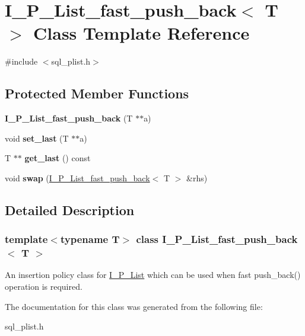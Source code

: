 \hypertarget{classI__P__List__fast__push__back}{}\section{I\+\_\+\+P\+\_\+\+List\+\_\+fast\+\_\+push\+\_\+back$<$ T $>$ Class Template Reference}
\label{classI__P__List__fast__push__back}


{\ttfamily \#include $<$sql\+\_\+plist.\+h$>$}

\subsection*{Protected Member Functions}
\begin{DoxyCompactItemize}
\item 
\mbox{\label{classI__P__List__fast__push__back_aefc6517c5e8850579d55af1cd1e1a921}} 
{\bfseries I\+\_\+\+P\+\_\+\+List\+\_\+fast\+\_\+push\+\_\+back} (T $\ast$$\ast$a)
\item 
\mbox{\label{classI__P__List__fast__push__back_ab1f2e919a615d9ebd62926f76dfa7078}} 
void {\bfseries set\+\_\+last} (T $\ast$$\ast$a)
\item 
\mbox{\label{classI__P__List__fast__push__back_a5db9427d4f3ffb513375aab41fb57f62}} 
T $\ast$$\ast$ {\bfseries get\+\_\+last} () const
\item 
\mbox{\label{classI__P__List__fast__push__back_a5ad21a91a1b3c87a50262ca3859ee442}} 
void {\bfseries swap} (\mbox{\hyperlink{classI__P__List__fast__push__back}{I\+\_\+\+P\+\_\+\+List\+\_\+fast\+\_\+push\+\_\+back}}$<$ T $>$ \&rhs)
\end{DoxyCompactItemize}


\subsection{Detailed Description}
\subsubsection*{template$<$typename T$>$\newline
class I\+\_\+\+P\+\_\+\+List\+\_\+fast\+\_\+push\+\_\+back$<$ T $>$}

An insertion policy class for \mbox{\hyperlink{classI__P__List}{I\+\_\+\+P\+\_\+\+List}} which can be used when fast push\+\_\+back() operation is required. 

The documentation for this class was generated from the following file\+:\begin{DoxyCompactItemize}
\item 
sql\+\_\+plist.\+h\end{DoxyCompactItemize}
